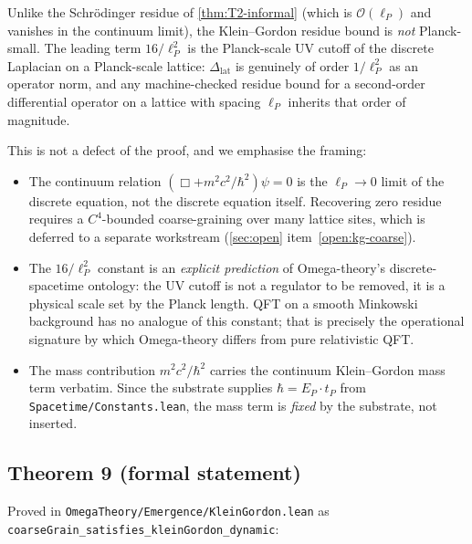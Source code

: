 \documentclass[11pt,a4paper,twoside]{article}
\theoremstyle{definition}
\newcommand{\lP}{\ell_P}
\newcommand{\tP}{t_P}
\newcommand{\EP}{E_P}
\newcommand{\code}[1]{\texttt{#1}}
\begin{document}
Unlike the Schr\"odinger residue of \cref{thm:T2-informal} (which is
$\mathcal{O}(\lP)$ and vanishes in the continuum limit), the
Klein--Gordon residue bound is \emph{not} Planck-small. The leading
term $16/\lP^{2}$ is the Planck-scale UV cutoff of the discrete
Laplacian on a Planck-scale lattice: $\Delta_{\mathrm{lat}}$ is
genuinely of order $1/\lP^{2}$ as an operator norm, and any
machine-checked residue bound for a second-order differential operator
on a lattice with spacing $\lP$ inherits that order of magnitude.

This is not a defect of the proof, and we emphasise the framing:

\begin{itemize}[leftmargin=1.4em]
\item The continuum relation $(\Box + m^{2} c^{2}/\hbar^{2})\psi = 0$
is the $\lP \to 0$ limit of the discrete equation, not the discrete
equation itself. Recovering zero residue requires a
$C^{4}$-bounded coarse-graining over many lattice sites, which is
deferred to a separate workstream
(\cref{sec:open} item~\ref{open:kg-coarse}).

\item The $16/\lP^{2}$ constant is an \emph{explicit prediction} of
Omega-theory's discrete-spacetime ontology: the UV cutoff is not a
regulator to be removed, it is a physical scale set by the Planck
length. QFT on a smooth Minkowski background has no analogue of this
constant; that is precisely the operational signature by which
Omega-theory differs from pure relativistic QFT.

\item The mass contribution $m^{2} c^{2}/\hbar^{2}$ carries the
continuum Klein--Gordon mass term verbatim. Since the substrate
supplies $\hbar = \EP \cdot \tP$ from
\code{Spacetime/Constants.lean}, the mass term is \emph{fixed} by the
substrate, not inserted.
\end{itemize}

\subsection{Theorem 9 (formal statement)}

Proved in \code{OmegaTheory/Emergence/KleinGordon.lean} as
\code{coarseGrain\_satisfies\_kleinGordon\_dynamic}:
\end{document}
